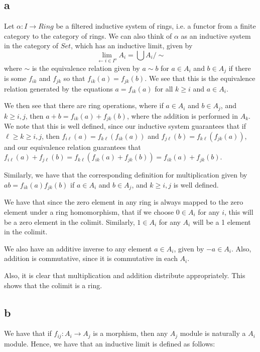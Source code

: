 \documentclass[a4paper]{article}
\theoremstyle{named}
\let\tempb\subsection
\renewcommand{\subsection}[1]{\tempb*{#1}}
\begin{document}
\subsection{a}
Let $\alpha : I \rightarrow Ring$ be a filtered inductive system of rings, i.e. a functor from a finite category to the category of rings. We can also think of $\alpha$ as an inductive system in the category of $Set$, which has an inductive limit, given by 
\[
    \lim_{\leftarrow i \in I^{o}} A_i = \bigcup A_i / \sim 
\]
where $\sim$ is the equivalence relation given by $a \sim b$ for $a \in A_i$ and $b \in A_j$ if there is some $f_{ik}$ and $f_{jk}$ so that $f_{ik}(a) = f_{jk}(b)$. We see that this is the equivalence relation generated by the equations $a = f_{ik}(a)$ for all $k \ge i$ and $a \in A_i$.

We then see that there are ring operations, where if $a \in A_i$ and $b \in A_j$, and $k \ge i, j$, then $a + b = f_{ik}(a) + f_{jk}(b)$, where the addition is performed in $A_k$. We note that this is well defined, since our inductive system guarantees that if $\ell \ge k \ge i, j$, then $f_{i\ell}(a) = f_{k\ell }(f_{ik}(a))$ and $f_{j\ell}(b) = f_{ k\ell }(f_{jk}(a))$, and our equivalence relation guarantees that $f_{i\ell}(a) + f_{j\ell}(b) = f_{k\ell}(f_{ik}(a) + f_{jk}(b)) = f_{ik}(a) + f_{jk}(b)$.

Similarly, we have that the corresponding definition for multiplication given by $ab = f_{ik}(a)f_{jk}(b)$ if $a \in A_i$ and $b \in A_j$, and $k \ge i, j$ is well defined. 


We have that  since the zero element in any ring is always mapped to the zero element under a ring homomorphism, that if we choose $0 \in A_i$ for any $i$, this will be a zero element in the colimit. Similarly, $1 \in A_i$ for any $A_i$ will be a 1 element in the colimit. 
 
We also have an additive inverse to any element $a \in A_i$, given by $-a \in A_i$. Also, addition is commutative, since it is commutative in each $A_i$.

Also, it is clear that multiplication and addition distribute appropriately. This shows that the colimit is a ring.
\subsection{b}
We have that if $f_{ij}: A_i \rightarrow A_j$ is a morphism, then any $A_j$ module is naturally a $A_i$ module. Hence, we have that an inductive limit is defined as follows:
\end{document}

